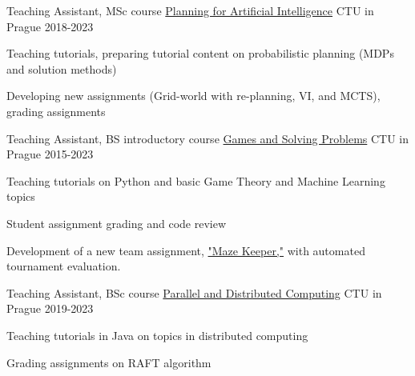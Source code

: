 

\begin{cventries}


  \cventry
    {Teaching Assistant, MSc course} %
    {\href{https://cw.fel.cvut.cz/b222/courses/pui/tutorials}{Planning for Artificial Intelligence}} %
    {CTU in Prague} %
    {2018-2023} %
    {
      \begin{cvitems} %
        \item {Teaching tutorials, preparing tutorial content on probabilistic planning (MDPs and solution methods)}
        \item {Developing new assignments (Grid-world with re-planning, VI, and MCTS), grading assignments}
      \end{cvitems}
    }

  \cventry
    {Teaching Assistant, BS introductory course} %
    {\href{https://cw.fel.cvut.cz/b221/courses/b4b33rph/start}{Games and Solving Problems}} %
    {CTU in Prague} %
    {2015-2023} %
    {
      \begin{cvitems} %
        \item {Teaching tutorials on Python and basic Game Theory and Machine Learning topics}
        \item {Student assignment grading and code review}
        \item {Development of a new team assignment, \href{https://cw.fel.cvut.cz/b181/courses/b4b33rph/cviceni/maze_keeper}{"Maze Keeper,"} with automated tournament evaluation.}
      \end{cvitems}
    }

  \cventry
    {Teaching Assistant, BSc course} %
    {\href{https://cw.fel.cvut.cz/b222/courses/b4b36pdv/tutorials/start}{Parallel and Distributed Computing}} %
    {CTU in Prague} %
    {2019-2023} %
    {
      \begin{cvitems} %
        \item {Teaching tutorials in Java on topics in distributed computing}
        \item {Grading assignments on RAFT algorithm}
      \end{cvitems}
    }

\end{cventries}
    

